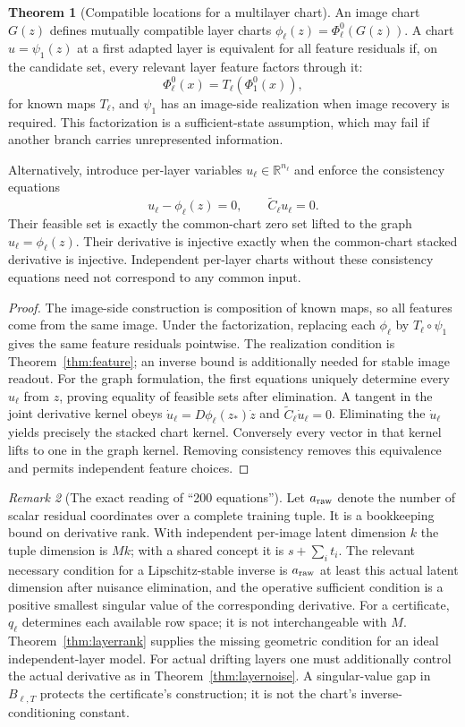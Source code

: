\documentclass[11pt,a4paper]{article}
\theoremstyle{definition}
\newtheorem{theorem}{Theorem}[section]
\theoremstyle{definition}
\theoremstyle{remark}\newtheorem{remark}[theorem]{Remark}
\newcommand{\R}{\mathbb R}\newcommand{\Prob}{\mathbb P}\newcommand{\E}{\mathbb E}
\begin{document}
\begin{theorem}[Compatible locations for a multilayer chart]\label{thm:compatibility}
An image chart $G(z)$ defines mutually compatible layer charts $\phi_\ell(z)=\Phi_\ell^0(G(z))$. A chart $u=\psi_1(z)$ at a first adapted layer is equivalent for all feature residuals if, on the candidate set, every relevant layer feature factors through it:
\[
\Phi_\ell^0(x)=T_\ell(\Phi_1^0(x)),
\]
for known maps $T_\ell$, and $\psi_1$ has an image-side realization when image recovery is required. This factorization is a sufficient-state assumption, which may fail if another branch carries unrepresented information.

Alternatively, introduce per-layer variables $u_\ell\in\R^{n_\ell}$ and enforce the consistency equations
\[
u_\ell-\phi_\ell(z)=0,\qquad \widetilde C_\ell u_\ell=0.
\]
Their feasible set is exactly the common-chart zero set lifted to the graph $u_\ell=\phi_\ell(z)$. Their derivative is injective exactly when the common-chart stacked derivative is injective. Independent per-layer charts without these consistency equations need not correspond to any common input.
\end{theorem}
\begin{proof}
The image-side construction is composition of known maps, so all features come from the same image. Under the factorization, replacing each $\phi_\ell$ by $T_\ell\circ\psi_1$ gives the same feature residuals pointwise. The realization condition is Theorem~\ref{thm:feature}; an inverse bound is additionally needed for stable image readout. For the graph formulation, the first equations uniquely determine every $u_\ell$ from $z$, proving equality of feasible sets after elimination. A tangent in the joint derivative kernel obeys $\dot u_\ell=D\phi_\ell(z_*)\dot z$ and $\widetilde C_\ell\dot u_\ell=0$. Eliminating the $\dot u_\ell$ yields precisely the stacked chart kernel. Conversely every vector in that kernel lifts to one in the graph kernel. Removing consistency removes this equivalence and permits independent feature choices.
\end{proof}

\begin{remark}[The exact reading of ``200 equations'']
Let $a_{\rm raw}$ denote the number of scalar residual coordinates over a complete training tuple. It is a bookkeeping bound on derivative rank. With independent per-image latent dimension $k$ the tuple dimension is $Mk$; with a shared concept it is $s+\sum_i t_i$. The relevant necessary condition for a Lipschitz-stable inverse is $a_{\rm raw}$ at least this actual latent dimension after nuisance elimination, and the operative sufficient condition is a positive smallest singular value of the corresponding derivative. For a certificate, $q_\ell$ determines each available row space; it is not interchangeable with $M$. Theorem~\ref{thm:layerrank} supplies the missing geometric condition for an ideal independent-layer model. For actual drifting layers one must additionally control the actual derivative as in Theorem~\ref{thm:layernoise}. A singular-value gap in $B_{\ell,T}$ protects the certificate's construction; it is not the chart's inverse-conditioning constant.
\end{remark}
\end{document}
